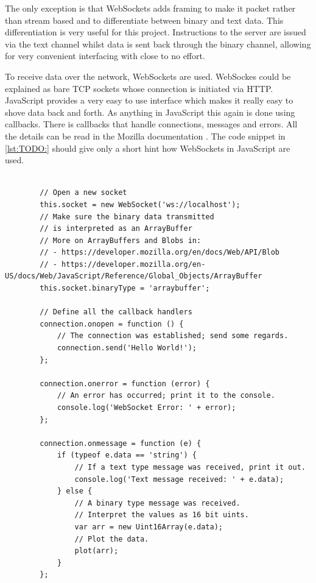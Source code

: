 The only exception is that WebSockets adds framing to make it packet rather than stream based and to differentiate between binary and text data.
This differentiation is very useful for this project. Instructions to the server are issued via the text channel whilst data is sent back through the binary channel, allowing for very convenient interfacing with close to no effort.

To receive data over the network, WebSockets are used. WebSockes could be explained as bare TCP sockets whose connection is initiated via HTTP.
JavaScript provides a very easy to use interface which makes it really easy to shove data back and forth.
As anything in JavaScript this again is done using callbacks. There is callbacks that handle connections, messages and errors. All the details can be read in the Mozilla documentation \cite{TODO: https://www.html5rocks.com/en/tutorials/websockets/basics/}. The code snippet in \ref{lst:TODO:} should give only a short hint how WebSockets in JavaScript are used.

\begin{tcolorbox}[
        title={
            \refstepcounter{listing}
            Listing \thelisting: JavaScript ``Get 2D Rendering Context''
            \label{lst:js2dcontext}
            \addcontentsline{lol}{listing}{\protect\numberline{\thelisting}}
        }
    ]
    \begin{verbatim}

        // Open a new socket
        this.socket = new WebSocket('ws://localhost');
        // Make sure the binary data transmitted
        // is interpreted as an ArrayBuffer
        // More on ArrayBuffers and Blobs in:
        // - https://developer.mozilla.org/en/docs/Web/API/Blob
        // - https://developer.mozilla.org/en-US/docs/Web/JavaScript/Reference/Global_Objects/ArrayBuffer
        this.socket.binaryType = 'arraybuffer';

        // Define all the callback handlers
        connection.onopen = function () {
            // The connection was established; send some regards.
            connection.send('Hello World!');
        };

        connection.onerror = function (error) {
            // An error has occurred; print it to the console.
            console.log('WebSocket Error: ' + error);
        };

        connection.onmessage = function (e) {
            if (typeof e.data == 'string') {
                // If a text type message was received, print it out.
                console.log('Text message received: ' + e.data);
            } else {
                // A binary type message was received.
                // Interpret the values as 16 bit uints.
                var arr = new Uint16Array(e.data);
                // Plot the data.
                plot(arr);
            }
        };
    \end{verbatim}
\end{tcolorbox}

